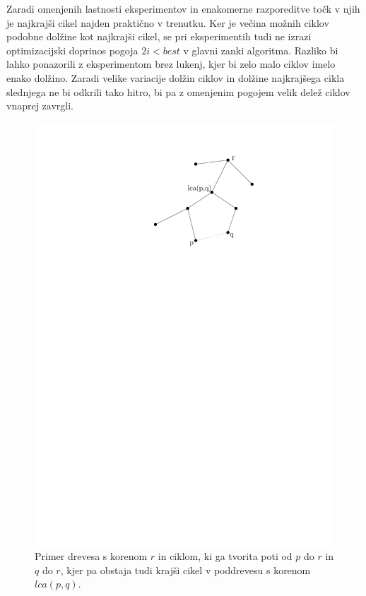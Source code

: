 \documentclass[a4paper, 12pt]{book}
\begin{document}
Zaradi omenjenih lastnosti eksperimentov in enakomerne razporeditve točk v njih je najkrajši cikel najden praktično v trenutku. Ker je večina možnih ciklov podobne dolžine kot najkrajši cikel, se pri eksperimentih tudi ne izrazi optimizacijski doprinos pogoja $2i < best$ v glavni zanki algoritma. Razliko bi lahko ponazorili z eksperimentom brez lukenj, kjer bi zelo malo ciklov imelo enako dolžino. Zaradi velike variacije dolžin ciklov in dolžine najkrajšega cikla slednjega ne bi odkrili tako hitro, bi pa z omenjenim pogojem velik delež ciklov vnaprej zavrgli.

\begin{figure}
\centerline{\includegraphics[scale=0.9]{pics/lca.pdf}}
\caption{Primer drevesa s korenom $r$ in ciklom, ki ga tvorita poti od $p$ do $r$ in $q$ do $r$, kjer pa obstaja tudi krajši cikel v poddrevesu s korenom $lca(p,q)$.}
\label{fig:lca}
\end{figure}
\end{document}
